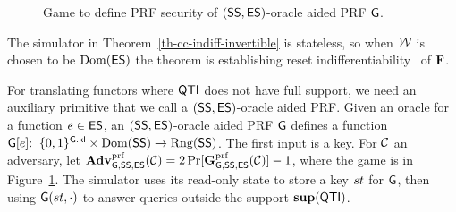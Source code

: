 \medskip

\begin{figure}[t]
	
	\caption{Game to define PRF security of $(\mathsf{SS},\mathsf{ES})$-oracle aided PRF $\mathsf{G}$.}\label{fig-prf}
	\hrulefill
\end{figure}


\noindent The simulator in Theorem~\ref{th-cc-indiff-invertible} is stateless, so when ${\cal W}$ is chosen to be $\mathrm{Dom}(\mathsf{ES})$ the theorem is establishing reset indifferentiability~\cite{EC:RisShaShr11} of $\mathbf{F}$. 

For translating functors where $\mathsf{QTI}$ does not have full support, we need an auxiliary primitive that we call a $(\mathsf{SS},\mathsf{ES})$-oracle aided PRF. Given an oracle for a function $e\in\mathsf{ES}$, an $(\mathsf{SS},\mathsf{ES})$-oracle aided PRF $\mathsf{G}$ defines a function $\mathsf{G}[e]{:\;\;}\{0,1\}^{\mathsf{G}.\mathsf{kl}}\times\mathrm{Dom}(\mathsf{SS})\to\mathrm{Rng}(\mathsf{SS})$. The first input is a key. For $\mathcal{C}$ an adversary, let $\mathbf{Adv}^{\mathrm{prf}}_{\mathsf{G},\mathsf{SS},\mathsf{ES}}(\mathcal{C}) = 2\Pr[\mathbf{G}^{\mathrm{prf}}_{\mathsf{G},\mathsf{SS},\mathsf{ES}}(\mathcal{C})]-1$, where the game is in Figure~\ref{fig-prf}. The simulator uses its read-only state to store a key $st$ for $\mathsf{G}$, then using $\mathsf{G}(st,\cdot)$ to answer queries outside the support $\mathbf{sup}(\mathsf{QTI})$. 

